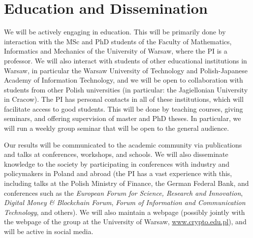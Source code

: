 \documentclass{article}
\begin{document}
\section{Education and Dissemination}

We will be actively engaging in education. This will be primarily done by interaction with the MSc and PhD students of the Faculty of Mathematics, Informatics and Mechanics of the University of Warsaw, where the PI is a professor. We will also interact with students of other educational institutions in Warsaw, in particular the Warsaw University of Technology and Polish-Japanese Academy of Information Technology, and we will be open to collaboration with students from other Polish universities (in particular: the Jagiellonian University in Cracow). The PI has personal contacts in all of these institutions, which will facilitate access to good students. This will be done by teaching courses, giving seminars, and offering supervision of master and PhD theses. In particular, we will run a weekly group seminar that will be open to the general audience.

Our results will be communicated to the academic community via publications and talks at conferences, workshops, and schools. We will also disseminate knowledge to the society by participating in conferences with industry and policymakers in Poland and abroad (the PI has a vast experience with this, including talks at the Polish Ministry of Finance, the German Federal Bank, and conferences such as the \emph{European Forum for Science, Research and Innovation}, \emph{Digital Money \& Blockchain Forum}, \emph{Forum of Information and Communication Technology}, and others).
We will also maintain a webpage (possibly jointly with the webpage of the group at the University of Warsaw, \url{www.crypto.edu.pl}), and will be active in social media.




\printbibliography
\end{document}
